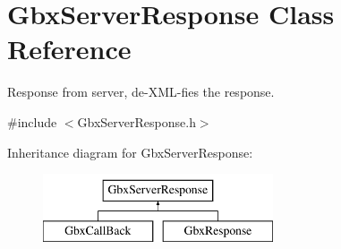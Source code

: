 \hypertarget{classGbxServerResponse}{\section{Gbx\-Server\-Response Class Reference}
\label{classGbxServerResponse}
}


Response from server, de-\/\-X\-M\-L-\/fies the response.  




{\ttfamily \#include $<$Gbx\-Server\-Response.\-h$>$}

Inheritance diagram for Gbx\-Server\-Response\-:\begin{figure}[H]
\begin{center}
\leavevmode
\includegraphics[height=2.000000cm]{classGbxServerResponse}
\end{center}
\end{figure}
